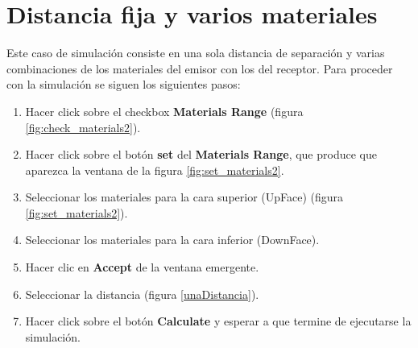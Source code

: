 	\section{Distancia fija y varios materiales}\label{DfMr}
Este caso de simulación consiste en una sola distancia de separación y varias combinaciones de los materiales del emisor con los del receptor. Para proceder con la simulación se siguen los siguientes pasos:
	\begin{enumerate}
			\item Hacer click sobre el checkbox \textbf{Materials Range} (figura \ref{fig:check_materials2}).
			\item Hacer click sobre el botón \textbf{set} del \textbf{Materials Range}, que produce que aparezca la ventana de la figura \ref{fig:set_materials2}.
			\item Seleccionar los materiales para la cara superior (UpFace) (figura \ref{fig:set_materials2}).
			\item Seleccionar los materiales para la cara inferior (DownFace).
			\item Hacer clic en \textbf{Accept} de la ventana emergente.
			\item Seleccionar la distancia (figura \ref{unaDistancia}). 
			\item Hacer click sobre el botón \textbf{Calculate} y esperar a que termine de ejecutarse la simulación.
	\end{enumerate}			
